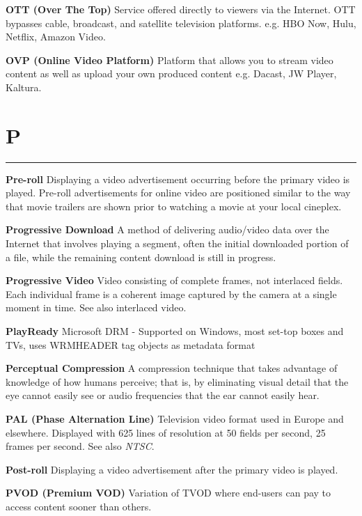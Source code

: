 \smallskip
\textbf{OTT (Over The Top)}
Service offered directly to viewers via the Internet. OTT bypasses cable, broadcast, and satellite television platforms. e.g. HBO Now, Hulu, Netflix, Amazon Video.

\smallskip
\textbf{OVP (Online Video Platform)}
Platform that allows you to stream video content as well as upload your own produced content e.g. Dacast, JW Player, Kaltura.


\section{P}
\hrule



\medskip
\textbf{Pre-roll}
Displaying a video advertisement occurring before the primary video is played. Pre-roll advertisements for online video are positioned similar to the way that movie trailers are shown prior to watching a movie at your local cineplex.


\smallskip
\textbf{Progressive Download}
A method of delivering audio/video data over the Internet that involves playing a segment, often the initial downloaded portion of a file, while the remaining content download is still in progress.

\smallskip
\textbf{Progressive Video}
Video consisting of complete frames, not interlaced fields. Each individual frame is a coherent image captured by the camera at a single moment in time. See also interlaced video.

\smallskip
\textbf{PlayReady}
Microsoft DRM - Supported on Windows, most set-top boxes and TVs, uses WRMHEADER tag objects as metadata format

\smallskip
\textbf{Perceptual Compression}
A compression technique that takes advantage of knowledge of how humans perceive; that is, by eliminating visual detail that the eye cannot easily see or audio frequencies that the ear cannot easily hear.

\smallskip
\textbf{PAL (Phase Alternation Line)}
Television video format used in Europe and elsewhere. Displayed with 625 lines of resolution at 50 fields per second, 25 frames per second. See also \textit{NTSC}.

\smallskip
\textbf{Post-roll}
Displaying a video advertisement after the primary video is played.

\smallskip
\textbf{PVOD (Premium VOD)}
Variation of TVOD where end-users can pay to access content sooner than others.

